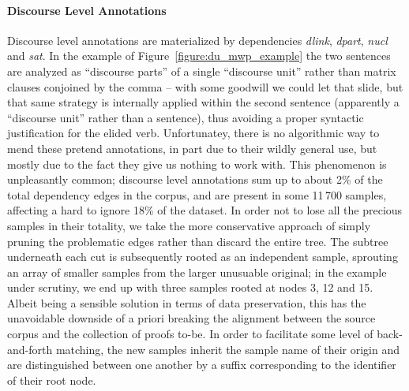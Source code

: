 \paragraph{Discourse Level Annotations}
Discourse level annotations are materialized by dependencies \textit{dlink}, \textit{dpart}, \textit{nucl} and \textit{sat}.
In the example of Figure~\ref{figure:du_mwp_example} the two sentences are analyzed as ``discourse parts'' of a single ``discourse unit'' rather than matrix clauses conjoined by the comma -- with some goodwill we could let that slide, but that same strategy is internally applied within the second sentence (apparently a ``discourse unit'' rather than a sentence), thus avoiding a proper syntactic justification for the elided verb. 
Unfortunatey, there is no algorithmic way to mend these pretend annotations, in part due to their wildly general use, but mostly due to the fact they give us nothing to work with.
This phenomenon is unpleasantly common; discourse level annotations sum up to about 2\% of the total dependency edges in the corpus, and are present in some 11\,700 samples, affecting a hard to ignore 18\% of the dataset.
In order not to lose all the precious samples in their totality, we take the more conservative approach of simply pruning the problematic edges rather than discard the entire tree.
The subtree underneath each cut is subsequently rooted as an independent sample, sprouting an array of smaller samples from the larger unusuable original; in the example under scrutiny, we end up with three samples rooted at nodes 3, 12 and 15.
Albeit being a sensible solution in terms of data preservation, this has the unavoidable downside of a priori breaking the alignment between the source corpus and the collection of proofs to-be.
In order to facilitate some level of back-and-forth matching, the new samples inherit the sample name of their origin and are distinguished between one another by a suffix corresponding to the identifier of their root node.

